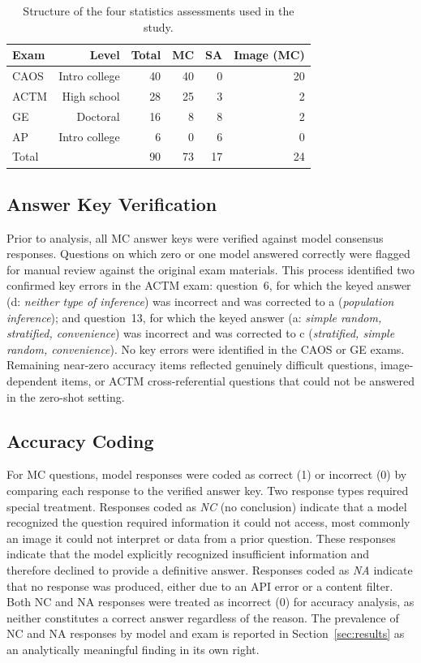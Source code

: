 \documentclass[APA,LATO2COL]{WileyNJDv5}
\begin{document}
\begin{table}[ht]
\caption{Structure of the four statistics assessments used in the study.}
\label{tab:exam_structure}
\begin{tabular}{lrrrrr}
\hline
Exam   & Level          & Total & MC & SA & Image (MC) \\
\hline
CAOS   & Intro college  & 40    & 40 &  0 & 20         \\
ACTM   & High school    & 28    & 25 &  3 &  2         \\
GE     & Doctoral       & 16    &  8 &  8 &  2         \\
AP     & Intro college  &  6    &  0 &  6 &  0         \\
\hline
Total  &                & 90    & 73 & 17 & 24         \\
\hline
\end{tabular}
\end{table}

\subsection{Answer Key Verification}
\label{sec:key_verification}

Prior to analysis, all MC answer keys were verified against model consensus
responses. Questions on which zero or one model answered correctly were
flagged for manual review against the original exam materials. This process
identified two confirmed key errors in the ACTM exam: question~6, for which
the keyed answer (d: \textit{neither type of inference}) was incorrect and
was corrected to a (\textit{population inference}); and question~13, for
which the keyed answer (a: \textit{simple random, stratified, convenience})
was incorrect and was corrected to c (\textit{stratified, simple random,
convenience}). No key errors were identified in the CAOS or GE exams.
Remaining near-zero accuracy items reflected genuinely difficult questions, image-dependent items, or ACTM cross-referential questions that could not be answered in the zero-shot setting.

\subsection{Accuracy Coding}
\label{sec:accuracy_coding}

For MC questions, model responses were coded as correct (1) or incorrect (0)
by comparing each response to the verified answer key. Two response types
required special treatment. Responses coded as \textit{NC} (no conclusion)
indicate that a model recognized the question required information it could
not access, most commonly an image it could not interpret or data from a
prior question. These responses indicate that the model explicitly recognized insufficient information and therefore declined to provide a definitive answer.
Responses coded as \textit{NA} indicate that no response was produced,
either due to an API error or a content filter. Both NC and NA responses
were treated as incorrect (0) for accuracy analysis, as neither constitutes
a correct answer regardless of the reason. The prevalence of NC and NA
responses by model and exam is reported in Section~\ref{sec:results} as an
analytically meaningful finding in its own right.
\end{document}

